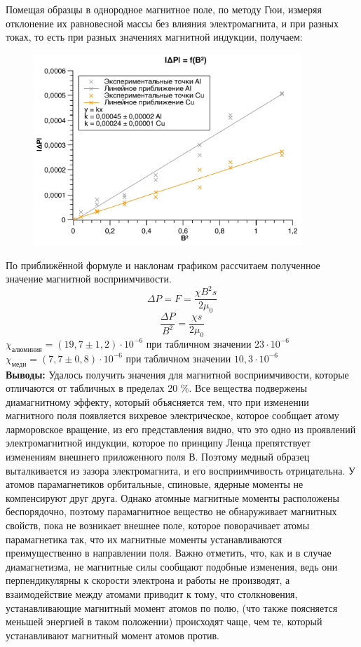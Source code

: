 \documentclass[a4paper, 12pt]{article}
\begin{document}
\noindent Помещая образцы в однородное магнитное поле, по методу Гюи, измеряя
отклонение их равновесной массы без влияния электромагнита, и при разных
токах, то есть при разных значениях магнитной индукции, получаем: \\
\newpage
 \begin{figure}[!h]
	\centering
	\includegraphics[width=0.9\textwidth]{Graphic_2.pdf} 
	
\end{figure}
\noindent По приближённой формуле и наклонам графиком рассчитаем полученное
значение магнитной восприимчивости.
 \[
 \Delta P = F = \frac{\chi B^2 s}{2 \mu_0}
 \]
\[
\frac{\Delta P}{B^2} = \frac{\chi s}{2 \mu_0}
\]
$\chi_{алюминия} = (19,7 \pm 1,2) \cdot 10^{-6}$ при табличном значении $23 \cdot 10^{-6}$ \\
$\chi_{меди} = (7,7 \pm 0,8) \cdot 10^{-6}$ при табличном значении $10,3 \cdot 10^{-6}$\\
\textbf{Выводы:} Удалось получить значения для магнитной восприимчивости, которые отличаются от табличных в пределах 20 \%. Все вещества подвержены диамагнитному эффекту, который объясняется тем, что при изменении магнитного поля появляется вихревое электрическое, которое сообщает атому ларморовское вращение, из его представления видно, что это одно из проявлений электромагнитной индукции, которое по принципу Ленца препятствует изменениям внешнего приложенного поля В. Поэтому медный образец выталкивается из зазора электромагнита, и его восприимчивость отрицательна. У атомов парамагнетиков орбитальные, спиновые, ядерные моменты не компенсируют друг друга. Однако атомные магнитные моменты расположены беспорядочно, поэтому парамагнитное вещество не обнаруживает магнитных свойств, пока не возникает внешнее поле, которое поворачивает атомы парамагнетика так, что их магнитные моменты устанавливаются преимущественно в направлении поля. Важно отметить, что, как и в случае диамагнетизма, не магнитные силы сообщают подобные изменения, ведь они перпендикулярны к скорости электрона и работы не производят, а взаимодействие между атомами приводит к тому, что столкновения, устанавливающие магнитный момент атомов по полю, (что также поясняется меньшей энергией в таком положении) происходят чаще, чем те, который устанавливают магнитный момент атомов против.
\end{document}
